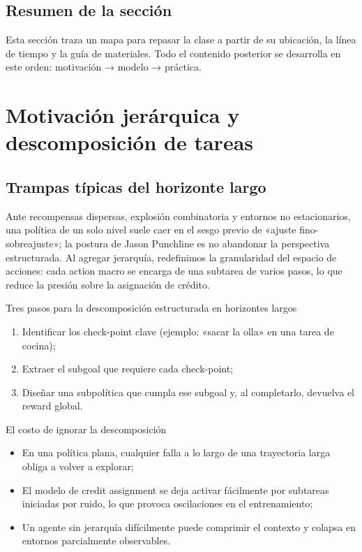 \documentclass[a4paper]{article}
\begin{document}
\subsection{Resumen de la sección}

Esta sección traza un mapa para repasar la clase a partir de su ubicación, la línea de tiempo y la guía de materiales. Todo el contenido posterior se desarrolla en este orden: motivación → modelo → práctica.
\section{Motivación jerárquica y descomposición de tareas}

\subsection{Trampas típicas del horizonte largo}

Ante recompensas dispersas, explosión combinatoria y entornos no estacionarios, una política de un solo nivel suele caer en el sesgo previo de «ajuste fino-sobreajuste»; la postura de Jason Punchline es no abandonar la perspectiva estructurada. Al agregar jerarquía, redefinimos la granularidad del espacio de acciones: cada action macro se encarga de una subtarea de varios pasos, lo que reduce la presión sobre la asignación de crédito.

\begin{knowledgebox}{Tres pasos para la descomposición estructurada en horizontes largos}
\begin{enumerate}
    \item Identificar los check-point clave (ejemplo: «sacar la olla» en una tarea de cocina);
    \item Extraer el subgoal que requiere cada check-point;
    \item Diseñar una subpolítica que cumpla ese subgoal y, al completarlo, devuelva el reward global.
\end{enumerate}
\end{knowledgebox}

\begin{warningbox}{El costo de ignorar la descomposición}
\begin{itemize}
    \item En una política plana, cualquier falla a lo largo de una trayectoria larga obliga a volver a explorar;
    \item El modelo de credit assignment se deja activar fácilmente por subtareas iniciadas por ruido, lo que provoca oscilaciones en el entrenamiento;
    \item Un agente sin jerarquía difícilmente puede comprimir el contexto y colapsa en entornos parcialmente observables.
\end{itemize}
\end{warningbox}
\end{document}
